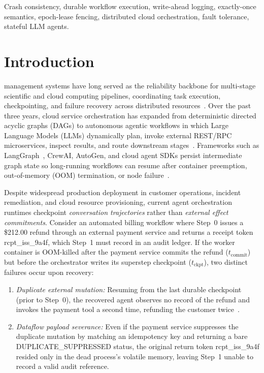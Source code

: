 \documentclass[10pt,journal]{IEEEtran}
\def\texttt#1{#1}%
\theoremstyle{definition}
\theoremstyle{remark}
\begin{document}
\begin{IEEEkeywords}
Crash consistency, durable workflow execution, write-ahead logging, exactly-once semantics, epoch-lease fencing, distributed cloud orchestration, fault tolerance, stateful LLM agents.
\end{IEEEkeywords}

\section{Introduction}\label{sec:intro}

 management systems have long served as the reliability backbone for multi-stage scientific and cloud computing pipelines, coordinating task execution, checkpointing, and failure recovery across distributed resources~\cite{juve2013characterizing,deelman2015pegasus,ferreiradasilva2017characterizing,chen2015faulttolerant,buyya2018manifesto}. Over the past three years, cloud service orchestration has expanded from deterministic directed acyclic graphs (DAGs) to autonomous agentic workflows in which Large Language Models (LLMs) dynamically plan, invoke external REST/RPC microservices, inspect results, and route downstream stages~\cite{yao2023react,schick2023toolformer,patil2024gorilla,yao2025taubench}. Frameworks such as \texttt{LangGraph}~\cite{langgraph2026}, \texttt{CrewAI}, \texttt{AutoGen}, and cloud agent SDKs persist intermediate graph state so long-running workflows can resume after container preemption, out-of-memory (\texttt{OOM}) termination, or node failure~\cite{cemri2025mast,khan2026resume}.

Despite widespread production deployment in customer operations, incident remediation, and cloud resource provisioning, current agent orchestration runtimes checkpoint \emph{conversation trajectories} rather than \emph{external effect commitments}. Consider an automated billing workflow where Step~0 issues a \$212.00 refund through an external payment service and returns a receipt token \texttt{rcpt\_iss\_9a4f}, which Step~1 must record in an audit ledger. If the worker container is \texttt{OOM}-killed after the payment service commits the refund ($t_{\mathrm{commit}}$) but before the orchestrator writes its superstep checkpoint ($t_{\mathrm{ckpt}}$), two distinct failures occur upon recovery:
\begin{enumerate}
  \item \emph{Duplicate external mutation:} Resuming from the last durable checkpoint (prior to Step~0), the recovered agent observes no record of the refund and invokes the payment tool a second time, refunding the customer twice~\cite{khan2026resume,safetoresume2026}.
  \item \emph{Dataflow payload severance:} Even if the payment service suppresses the duplicate mutation by matching an idempotency key and returning a bare \texttt{DUPLICATE\_SUPPRESSED} status, the original return token \texttt{rcpt\_iss\_9a4f} resided only in the dead process's volatile memory, leaving Step~1 unable to record a valid audit reference.
\end{enumerate}
\end{document}
